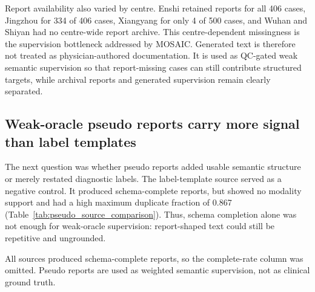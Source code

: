 Report availability also varied by centre. Enshi retained reports for all 406 cases, Jingzhou for 334 of 406 cases, Xiangyang for only 4 of 500 cases, and Wuhan and Shiyan had no centre-wide report archive. This centre-dependent missingness is the supervision bottleneck addressed by MOSAIC. Generated text is therefore not treated as physician-authored documentation. It is used as QC-gated weak semantic supervision so that report-missing cases can still contribute structured targets, while archival reports and generated supervision remain clearly separated.

\FloatBarrier

\subsection{Weak-oracle pseudo reports carry more signal than label templates}
\label{subsec:pseudo_report_results}

The next question was whether pseudo reports added usable semantic structure or merely restated diagnostic labels. The label-template source served as a negative control. It produced schema-complete reports, but showed no modality support and had a high maximum duplicate fraction of 0.867 (Table~\ref{tab:pseudo_source_comparison}). Thus, schema completion alone was not enough for weak-oracle supervision: report-shaped text could still be repetitive and ungrounded.

\begin{table}[!htbp]
  \centering
  \caption{Structured pseudo-report source comparison.}
  \label{tab:pseudo_source_comparison}
  \scriptsize
  \begin{threeparttable}
  \begin{tablenotes}[flushleft]
    \footnotesize
    \item All sources produced schema-complete reports, so the complete-rate column was omitted. Pseudo reports are used as weighted semantic supervision, not as clinical ground truth.
  \end{tablenotes}
  \end{threeparttable}
\end{table}

